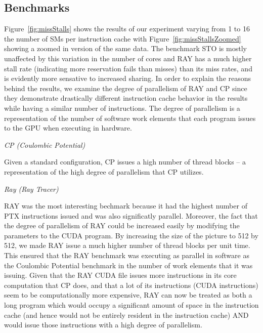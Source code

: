 

\subsection{Benchmarks}
\label{sec:benchmarks}
Figure~\ref{fig:missStalls} shows the results of our experiment
varying from 1 to 16 the number of SMs per instruction cache with
Figure~\ref{fig:missStallsZoomed} showing a zoomed in version of the
same data.
The benchmark STO is mostly unaffected by this variation in the number
of cores and RAY has a much higher stall rate (indicating more
reservation fails than misses) than its miss rates, and is evidently
more sensative to increased sharing.
In order to explain the reasons behind the results, we examine the
degree of parallelism of RAY and CP since they demonstrate drastically
different instruction cache behavior in the results while having a
similar number of instructions.
The degree of parallelism is a representation of the number of software
work elements that each program issues to the GPU when executing in
hardware. 

\emph{CP (Coulombic Potential)}

Given a standard configuration, CP issues a high number of thread
blocks -- a representation of the high degree of parallelism that CP
utilizes.

\emph{Ray (Ray Tracer)}

RAY was the most interesting bechmark because it had the highest
number of PTX instructions issued and was also significatly parallel. 
Moreover, the fact that the degree of parallelism of RAY could be
increased easily by modifying the parameters to the CUDA program.
By increasing the size of the picture to 512 by 512, we made RAY issue
a much higher number of thread blocks per unit time. 
This ensured that the RAY benchmark was executing as parallel in
software as the Coulombic Potential benchmark in the number of work
elements that it was issuing. 
Given that the RAY CUDA file issues more instructions in its core
computation that CP does, and that a lot of its instructions (CUDA
instructions) seem to be computationally more expensive, RAY can now
be treated as both a long program which would occupy a significant
amount of space in the instruction cache (and hence would not be
entirely resident in the instruction cache) AND would issue those
instructions with a high degree of parallelism.

